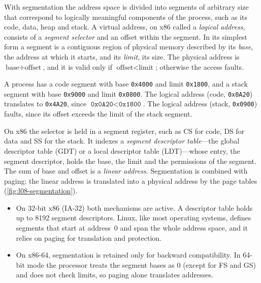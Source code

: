 \documentclass[../main.tex]{subfiles}
\begin{document}
With segmentation the address space is divided into segments of arbitrary
size that correspond to logically meaningful components of the process,
such as its code, data, heap and stack.  A virtual
address, on x86 called a \emph{logical address}, consists of a \emph{segment
selector} and an offset within the segment.  In its simplest form a segment
is a contiguous region of physical memory described by its \emph{base}, the
address at which it starts, and its \emph{limit}, its size.  The physical
address is $\text{base} + \text{offset}$, and it is valid only if
$\text{offset} < \text{limit}$; otherwise the access faults.

\begin{example}
  A process has a code segment with base \texttt{0x4000} and limit
  \texttt{0x1800}, and a stack segment with base \texttt{0x9000} and limit
  \texttt{0x0800}.  The logical address (code, \texttt{0x0A20}) translates
  to \texttt{0x4A20}, since $\texttt{0x0A20} < \texttt{0x1800}$.  The
  logical address (stack, \texttt{0x0900}) faults, since its offset exceeds
  the limit of the stack segment.
\end{example}

On x86 the selector is held in a segment register, such as CS for code, DS
for data and SS for the stack.  It indexes a \emph{segment descriptor
table}---the global descriptor table (GDT) or a local descriptor table
(LDT)---whose entry, the segment descriptor, holds the base, the limit and
the permissions of the segment.  The sum of base and offset is a \emph{linear
address}.  Segmentation is combined with paging: the linear address is
translated into a physical address by the page tables
(\cref{fig:l08-segmentation}).
\begin{itemize}
  \item On 32-bit x86 (IA-32) both mechanisms are active.  A descriptor
    table holds up to 8192 segment descriptors.  Linux, like most
    operating systems, defines segments that start at address~0 and span
    the whole address space, and it relies on paging for translation and
    protection.
  \item On x86-64, segmentation is retained only for backward
    compatibility.  In 64-bit mode the processor treats the segment bases as
    0 (except for FS and GS) and does not check limits, so paging alone
    translates addresses.
\end{itemize}
\end{document}
